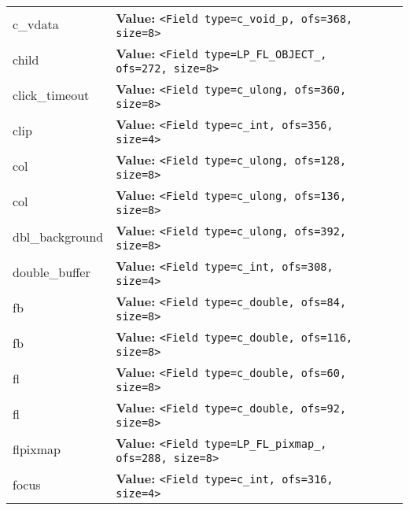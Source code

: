 \begin{longtable}{|p{\varnamewidth}|p{\vardescrwidth}|l}
\cline{1-2}
\raggedright c\-\_\-v\-d\-a\-t\-a\- & \raggedright \textbf{Value:} 
{\tt {\textless}Field type=c\_void\_p, ofs=368, size=8{\textgreater}}&\\
\cline{1-2}
\raggedright c\-h\-i\-l\-d\- & \raggedright \textbf{Value:} 
{\tt {\textless}Field type=LP\_FL\_OBJECT\_, ofs=272, size=8{\textgreater}}&\\
\cline{1-2}
\raggedright c\-l\-i\-c\-k\-\_\-t\-i\-m\-e\-o\-u\-t\- & \raggedright \textbf{Value:} 
{\tt {\textless}Field type=c\_ulong, ofs=360, size=8{\textgreater}}&\\
\cline{1-2}
\raggedright c\-l\-i\-p\- & \raggedright \textbf{Value:} 
{\tt {\textless}Field type=c\_int, ofs=356, size=4{\textgreater}}&\\
\cline{1-2}
\raggedright c\-o\-l\-1\- & \raggedright \textbf{Value:} 
{\tt {\textless}Field type=c\_ulong, ofs=128, size=8{\textgreater}}&\\
\cline{1-2}
\raggedright c\-o\-l\-2\- & \raggedright \textbf{Value:} 
{\tt {\textless}Field type=c\_ulong, ofs=136, size=8{\textgreater}}&\\
\cline{1-2}
\raggedright d\-b\-l\-\_\-b\-a\-c\-k\-g\-r\-o\-u\-n\-d\- & \raggedright \textbf{Value:} 
{\tt {\textless}Field type=c\_ulong, ofs=392, size=8{\textgreater}}&\\
\cline{1-2}
\raggedright d\-o\-u\-b\-l\-e\-\_\-b\-u\-f\-f\-e\-r\- & \raggedright \textbf{Value:} 
{\tt {\textless}Field type=c\_int, ofs=308, size=4{\textgreater}}&\\
\cline{1-2}
\raggedright f\-b\-1\- & \raggedright \textbf{Value:} 
{\tt {\textless}Field type=c\_double, ofs=84, size=8{\textgreater}}&\\
\cline{1-2}
\raggedright f\-b\-2\- & \raggedright \textbf{Value:} 
{\tt {\textless}Field type=c\_double, ofs=116, size=8{\textgreater}}&\\
\cline{1-2}
\raggedright f\-l\-1\- & \raggedright \textbf{Value:} 
{\tt {\textless}Field type=c\_double, ofs=60, size=8{\textgreater}}&\\
\cline{1-2}
\raggedright f\-l\-2\- & \raggedright \textbf{Value:} 
{\tt {\textless}Field type=c\_double, ofs=92, size=8{\textgreater}}&\\
\cline{1-2}
\raggedright f\-l\-p\-i\-x\-m\-a\-p\- & \raggedright \textbf{Value:} 
{\tt {\textless}Field type=LP\_FL\_pixmap\_, ofs=288, size=8{\textgreater}}&\\
\cline{1-2}
\raggedright f\-o\-c\-u\-s\- & \raggedright \textbf{Value:} 
{\tt {\textless}Field type=c\_int, ofs=316, size=4{\textgreater}}&\\

\end{longtable}

